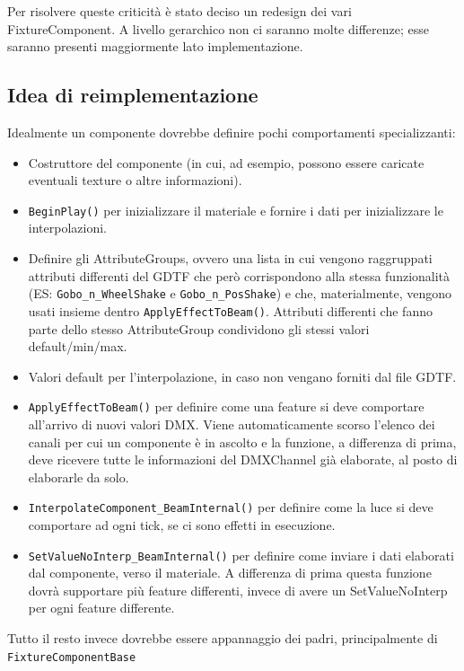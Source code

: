 \documentclass[main.tex]{subfiles}
\begin{document}
Per risolvere queste criticità è stato deciso un redesign dei vari FixtureComponent. A livello gerarchico non ci saranno molte differenze; esse saranno presenti maggiormente lato implementazione.

\subsection{Idea di reimplementazione}\label{subsec:3_idea}
Idealmente un componente dovrebbe definire pochi comportamenti specializzanti:
\begin{itemize}
    \item Costruttore del componente (in cui, ad esempio, possono essere caricate eventuali texture o altre informazioni).
    \item \lstinline{BeginPlay()} per inizializzare il materiale e fornire i dati per inizializzare le interpolazioni.
    \item Definire gli AttributeGroups, ovvero una lista in cui vengono raggruppati attributi differenti del GDTF che però corrispondono alla stessa funzionalità (ES: \lstinline{Gobo_n_WheelShake} e \lstinline{Gobo_n_PosShake}) e che, materialmente, vengono usati insieme dentro \lstinline{ApplyEffectToBeam()}. Attributi differenti che fanno parte dello stesso AttributeGroup condividono gli stessi valori default/min/max.
    \item Valori default per l'interpolazione, in caso non vengano forniti dal file GDTF.
    \item \lstinline{ApplyEffectToBeam()} per definire come una feature si deve comportare all'arrivo di nuovi valori DMX. Viene automaticamente scorso l'elenco dei canali per cui un componente è in ascolto e la funzione, a differenza di prima, deve ricevere tutte le informazioni del DMXChannel già elaborate, al posto di elaborarle da solo. 
    \item \lstinline{InterpolateComponent_BeamInternal()} per definire come la luce si deve comportare ad ogni tick, se ci sono effetti in esecuzione.
    \item \lstinline{SetValueNoInterp_BeamInternal()} per definire come inviare i dati elaborati dal componente, verso il materiale. A differenza di prima questa funzione dovrà supportare più feature differenti, invece di avere un SetValueNoInterp per ogni feature differente.
\end{itemize}

Tutto il resto invece dovrebbe essere appannaggio  dei padri, principalmente di \lstinline{FixtureComponentBase}\newline
\end{document}
